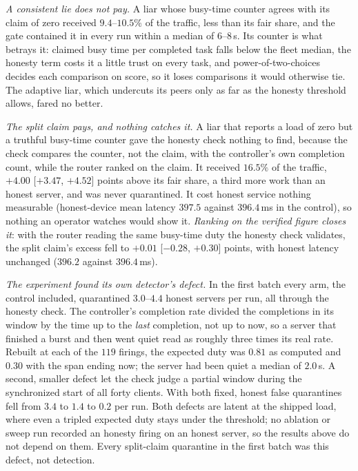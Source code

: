 \documentclass[10pt,twocolumn,letterpaper]{article}
\begin{document}
\emph{A consistent lie does not pay.} A liar whose busy-time counter agrees
with its claim of zero received $9.4$--$10.5\%$ of the traffic, less than its
fair share, and the gate contained it in every run within a median of
$6$--$8$\,s. Its counter is what betrays it: claimed busy time per completed
task falls below the fleet median, the honesty term costs it a little trust
on every task, and power-of-two-choices decides each comparison on score, so
it loses comparisons it would otherwise tie. The adaptive liar, which undercuts
its peers only as far as the honesty threshold allows, fared no better.

\emph{The split claim pays, and nothing catches it.} A liar that reports a
load of zero but a truthful busy-time counter gave the honesty check nothing
to find, because the check compares the counter, not the claim, with the
controller's own completion count, while the router ranked on the claim. It
received $16.5\%$ of the traffic, $+4.00$ [$+3.47$, $+4.52$] points above its
fair share, a third more work than an honest server, and was never
quarantined. It cost honest service nothing measurable (honest-device mean
latency $397.5$ against $396.4$\,ms in the control), so nothing an operator
watches would show it. \emph{Ranking on the verified figure closes it}: with
the router reading the same busy-time duty the honesty check validates, the
split claim's excess fell to $+0.01$ [$-0.28$, $+0.30$] points, with honest
latency unchanged ($396.2$ against $396.4$\,ms).

\emph{The experiment found its own detector's defect.} In the first batch
every arm, the control included, quarantined $3.0$--$4.4$ honest servers per
run, all through the honesty check. The controller's completion rate divided
the completions in its window by the time up to the \emph{last} completion,
not up to now, so a server that finished a burst and then went quiet read as
roughly three times its real rate. Rebuilt at each of the $119$ firings, the
expected duty was $0.81$ as computed and $0.30$ with the span ending now; the
server had been quiet a median of $2.0$\,s. A second, smaller defect let the
check judge a partial window during the synchronized start of all forty
clients. With both fixed, honest false quarantines fell from $3.4$ to $1.4$ to
$0.2$ per run. Both defects are latent at the shipped load, where even a
tripled expected duty stays under the threshold; no ablation or sweep run
recorded an honesty firing on an honest server, so the results above do not
depend on them. Every split-claim quarantine in the first batch was this
defect, not detection.
\end{document}
